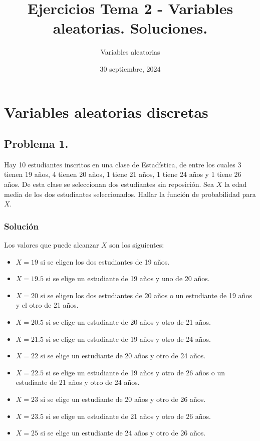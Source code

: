 \documentclass[
]{article}
\title{Ejercicios Tema 2 - Variables aleatorias. Soluciones.}
\author{Variables aleatorias}
\date{30 septiembre, 2024}
\providecommand{\tightlist}{%
  \setlength{\itemsep}{0pt}\setlength{\parskip}{0pt}}
\begin{document}
\maketitle

{
\hypersetup{linkcolor=blue}
\setcounter{tocdepth}{4}
\tableofcontents
}
\section{Variables aleatorias
discretas}\label{variables-aleatorias-discretas}

\subsection{Problema 1.}\label{problema-1.}

Hay 10 estudiantes inscritos en una clase de Estadística, de entre los
cuales 3 tienen 19 años, 4 tienen 20 años, 1 tiene 21 años, 1 tiene 24
años y 1 tiene 26 años. De esta clase se seleccionan dos estudiantes sin
reposición. Sea \(X\) la edad media de los dos estudiantes
seleccionados. Hallar la función de probabilidad para \(X\).

\subsubsection{Solución}\label{soluciuxf3n}

Los valores que puede alcanzar \(X\) son los siguientes:

\begin{itemize}
\tightlist
\item
  \(X=19\) si se eligen los dos estudiantes de 19 años.
\item
  \(X=19.5\) si se elige un estudiante de 19 años y uno de 20 años.
\item
  \(X=20\) si se eligen los dos estudiantes de 20 años o un estudiante
  de 19 años y el otro de 21 años.
\item
  \(X=20.5\) si se elige un estudiante de 20 años y otro de 21 años.
\item
  \(X=21.5\) si se elige un estudiante de 19 años y otro de 24 años.
\item
  \(X=22\) si se elige un estudiante de 20 años y otro de 24 años.
\item
  \(X=22.5\) si se elige un estudiante de 19 años y otro de 26 años o un
  estudiante de 21 años y otro de 24 años.
\item
  \(X=23\) si se elige un estudiante de 20 años y otro de 26 años.
\item
  \(X=23.5\) si se elige un estudiante de 21 años y otro de 26 años.
\item
  \(X=25\) si se elige un estudiante de 24 años y otro de 26 años.
\end{itemize}
\end{document}
